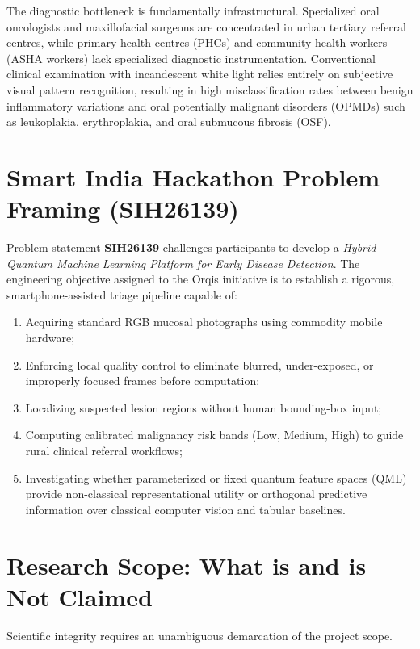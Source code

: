 \documentclass[11pt,a4paper]{report}
\begin{document}
The diagnostic bottleneck is fundamentally infrastructural. Specialized oral oncologists and maxillofacial surgeons are concentrated in urban tertiary referral centres, while primary health centres (PHCs) and community health workers (ASHA workers) lack specialized diagnostic instrumentation. Conventional clinical examination with incandescent white light relies entirely on subjective visual pattern recognition, resulting in high misclassification rates between benign inflammatory variations and oral potentially malignant disorders (OPMDs) such as leukoplakia, erythroplakia, and oral submucous fibrosis (OSF).

\section{Smart India Hackathon Problem Framing (SIH26139)}
Problem statement \textbf{SIH26139} challenges participants to develop a \textit{Hybrid Quantum Machine Learning Platform for Early Disease Detection}. The engineering objective assigned to the Orqis initiative is to establish a rigorous, smartphone-assisted triage pipeline capable of:
\begin{enumerate}
  \item Acquiring standard RGB mucosal photographs using commodity mobile hardware;
  \item Enforcing local quality control to eliminate blurred, under-exposed, or improperly focused frames before computation;
  \item Localizing suspected lesion regions without human bounding-box input;
  \item Computing calibrated malignancy risk bands (Low, Medium, High) to guide rural clinical referral workflows;
  \item Investigating whether parameterized or fixed quantum feature spaces (QML) provide non-classical representational utility or orthogonal predictive information over classical computer vision and tabular baselines.
\end{enumerate}

\section{Research Scope: What is and is Not Claimed}
Scientific integrity requires an unambiguous demarcation of the project scope. 
\end{document}
